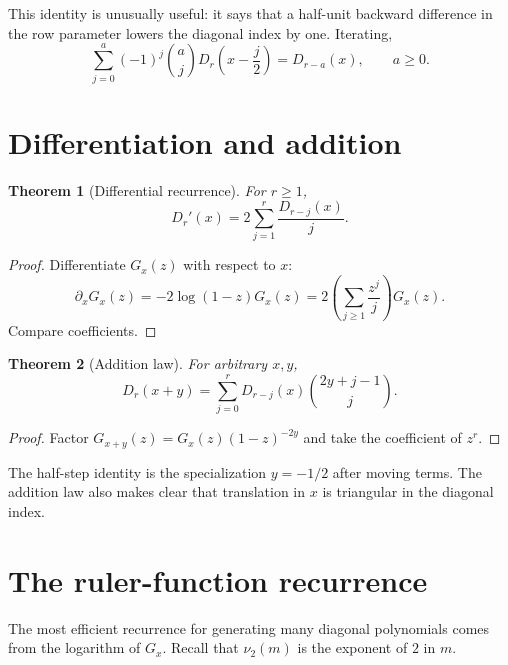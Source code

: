 \documentclass[11pt,a4paper,oneside,openany]{book}
\numberwithin{equation}{chapter}
\newtheorem{theorem}{Theorem}[chapter]
\theoremstyle{definition}
\theoremstyle{remark}
\newcommand{\nuTwo}{\nu_2}
\newcommand{\Diag}{D}
\begin{document}
This identity is unusually useful: it says that a half-unit backward
difference in the row parameter lowers the diagonal index by one.  Iterating,
\begin{equation}
 \sum_{j=0}^{a}(-1)^j\binom aj
 \Diag_r\!\left(x-\frac j2\right)
 =\Diag_{r-a}(x),
 \qquad a\ge0.
 \label{a:eq:iterated-half-step}
\end{equation}

\section{Differentiation and addition}

\begin{theorem}[Differential recurrence]
For \(r\ge1\),
\begin{equation}
 \boxed{
 \Diag_r'(x)=2\sum_{j=1}^{r}\frac{\Diag_{r-j}(x)}{j}.}
 \label{a:eq:differential-recurrence}
\end{equation}
\end{theorem}

\begin{proof}
Differentiate \(G_x(z)\) with respect to \(x\):
\[
 \partial_xG_x(z)=-2\log(1-z)G_x(z)
 =2\left(\sum_{j\ge1}\frac{z^j}{j}\right)G_x(z).
\]
Compare coefficients.
\end{proof}

\begin{theorem}[Addition law]
For arbitrary \(x,y\),
\begin{equation}
 \boxed{
 \Diag_r(x+y)=\sum_{j=0}^{r}
 \Diag_{r-j}(x)\binom{2y+j-1}{j}.}
 \label{a:eq:addition-law}
\end{equation}
\end{theorem}

\begin{proof}
Factor \(G_{x+y}(z)=G_x(z)(1-z)^{-2y}\) and take the coefficient of \(z^r\).
\end{proof}

The half-step identity is the specialization \(y=-1/2\) after moving terms.
The addition law also makes clear that translation in \(x\) is triangular in
the diagonal index.

\section{The ruler-function recurrence}

The most efficient recurrence for generating many diagonal polynomials comes
from the logarithm of \(G_x\).  Recall that \(\nuTwo(m)\) is the exponent of
\(2\) in \(m\).
\end{document}
